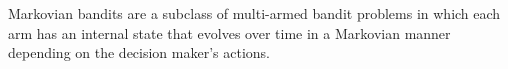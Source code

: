 Markovian bandits are a subclass of multi-armed bandit problems in which each arm has an internal state that evolves over time in a Markovian manner depending on the decision maker's actions. 
